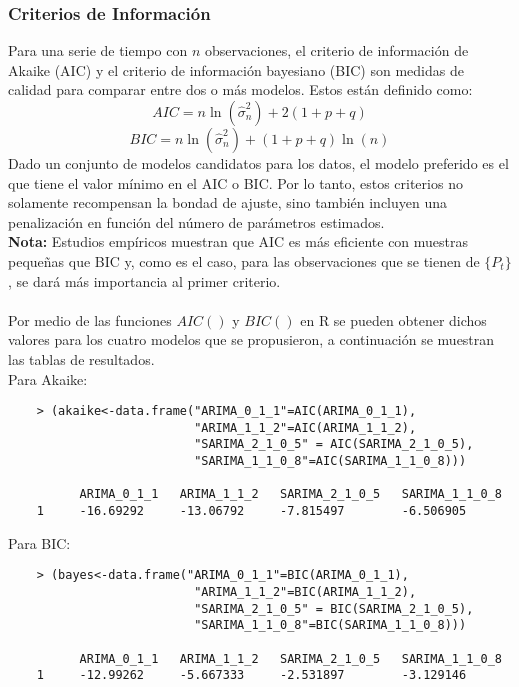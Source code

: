 \documentclass{article}
\theoremstyle{remark}
\begin{document}
\subsubsection{Criterios de Información}
Para una serie de tiempo con $n$ observaciones, el criterio de información de Akaike (AIC) y el criterio de información bayesiano (BIC) son medidas de calidad para comparar entre dos o más modelos. Estos están definido como: 
\[AIC =n \ln (\hat{\sigma}^2_n) + 2(1+ p+ q) \]
\[BIC =n \ln (\hat{\sigma}^2_n) + (1+ p+ q)\ln(n) \]
Dado un conjunto de modelos candidatos para los datos, el modelo preferido es el que tiene el valor mínimo en el AIC o BIC. Por lo tanto, estos criterios no solamente recompensan la bondad de ajuste, sino también incluyen una penalización en función del número de parámetros estimados. \\%

\textbf{Nota:} Estudios empíricos muestran que AIC es más eficiente con muestras pequeñas que BIC y, como es el caso, para las observaciones que se tienen de $\{P_t\}$, se dará más importancia al primer criterio.\\\\
Por medio de las funciones $AIC()$ y $BIC()$ en R se pueden obtener dichos valores para los cuatro modelos que se propusieron, a continuación se muestran las tablas de resultados.\\
Para Akaike:
\begin{verbatim}
    > (akaike<-data.frame("ARIMA_0_1_1"=AIC(ARIMA_0_1_1),
                          "ARIMA_1_1_2"=AIC(ARIMA_1_1_2),
                          "SARIMA_2_1_0_5" = AIC(SARIMA_2_1_0_5),
                          "SARIMA_1_1_0_8"=AIC(SARIMA_1_1_0_8)))
                   
          ARIMA_0_1_1   ARIMA_1_1_2   SARIMA_2_1_0_5   SARIMA_1_1_0_8
    1     -16.69292     -13.06792     -7.815497        -6.506905
\end{verbatim}
Para BIC:
\begin{verbatim}
    > (bayes<-data.frame("ARIMA_0_1_1"=BIC(ARIMA_0_1_1),
                          "ARIMA_1_1_2"=BIC(ARIMA_1_1_2),
                          "SARIMA_2_1_0_5" = BIC(SARIMA_2_1_0_5),
                          "SARIMA_1_1_0_8"=BIC(SARIMA_1_1_0_8)))
                   
          ARIMA_0_1_1   ARIMA_1_1_2   SARIMA_2_1_0_5   SARIMA_1_1_0_8
    1     -12.99262     -5.667333     -2.531897        -3.129146
\end{verbatim}
\end{document}

